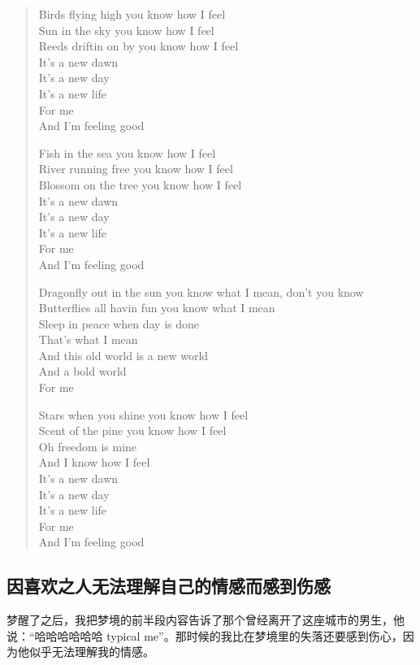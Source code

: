 \blockquote{
Birds flying high you know how I feel\\
Sun in the sky you know how I feel\\
Reeds driftin on by you know how I feel\\
It's a new dawn\\
It's a new day\\
It's a new life\\
For me\\
And I'm feeling good

Fish in the sea you know how I feel\\
River running free you know how I feel\\
Blossom on the tree you know how I feel\\
It's a new dawn\\
It's a new day\\
It's a new life\\
For me\\
And I'm feeling good

Dragonfly out in the sun you know what I mean, don't you know\\
Butterflies all havin fun you know what I mean\\
Sleep in peace when day is done\\
That's what I mean\\
And this old world is a new world\\
And a bold world\\
For me

Stars when you shine you know how I feel\\
Scent of the pine you know how I feel\\
Oh freedom is mine \\
And I know how I feel\\
It's a new dawn\\
It's a new day\\
It's a new life\\
For me\\
And I'm feeling good
}




\subsection*{因喜欢之人无法理解自己的情感而感到伤感}

梦醒了之后，我把梦境的前半段内容告诉了那个曾经离开了这座城市的男生，他说：“哈哈哈哈哈哈 typical me”。那时候的我比在梦境里的失落还要感到伤心，因为他似乎无法理解我的情感。

